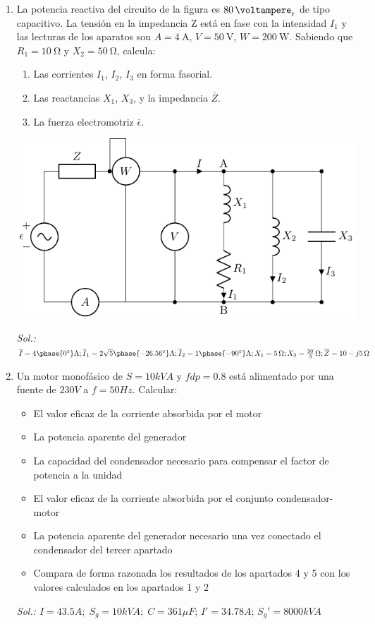 \begin{enumerate}
\item La potencia reactiva del circuito de la figura es
  $\qty{80}{\voltampere_r}$ de tipo capacitivo. La tensión en la
  impedancia Z está en fase con la intensidad $I_1$ y las lecturas de
  los aparatos son $A = \qty{4}{\ampere}$, $V = \qty{50}{\volt}$,
  $W = \qty{200}{\watt}$. Sabiendo que $R_1 = \qty{10}{\ohm}$ y
  $X_2 = \qty{50}{\ohm}$, calcula:

  \begin{enumerate}
  \item Las corrientes $I_1$, $I_2$, $I_3$ en forma fasorial.
  \item Las reactancias $X_1$, $X_3$, y la impedancia $\overline{Z}$.
  \item La fuerza electromotriz $\overline{\epsilon}$.
  \end{enumerate}
  \begin{center}
    \includegraphics{../figs/BT2_circuitoCapacitivo}
  \end{center}
  \emph{Sol.:\; 
    $\overline{I} =
    4\phase{\ang{0}}\unit{\ampere};
    \overline{I}_1 =
    2\sqrt{5}\phase{\ang{-26.56}}\unit{\ampere}
    ; \overline{I}_2 =
    1\phase{\ang{-90}}\unit{\ampere} ; X_1 =
    \qty{5}{\ohm}; X_3 =
    \qty[parse-numbers=false]{\frac{50}{3}}{\ohm}; \overline{Z} =
    \qty[parse-numbers=false]{10 - j5}{\ohm}$ }

\item Un motor monofásico de $S = {10}{kVA}$ y $fdp = 0.8$ está
  alimentado por una fuente de ${230}{V}$ a $f = {50}{Hz}$.  Calcular:
  \begin{itemize}
  \item El valor eficaz de la corriente absorbida por el motor
  \item La potencia aparente del generador
  \item La capacidad del condensador necesario para compensar el
    factor de potencia a la unidad
  \item El valor eficaz de la corriente absorbida por el conjunto
    condensador-motor
  \item La potencia aparente del generador necesario una vez conectado
    el condensador del tercer apartado
  \item Compara de forma razonada los resultados de los apartados 4 y
    5 con los valores calculados en los apartados 1 y 2
  \end{itemize}
  \emph{Sol.:
    $I= {43.5}{A};\; S_g = {10}{kVA};\;C={361}{\mu F};\, I'=34.78A;\,
    S_g' = {8000}{kVA}$}


\end{enumerate}
